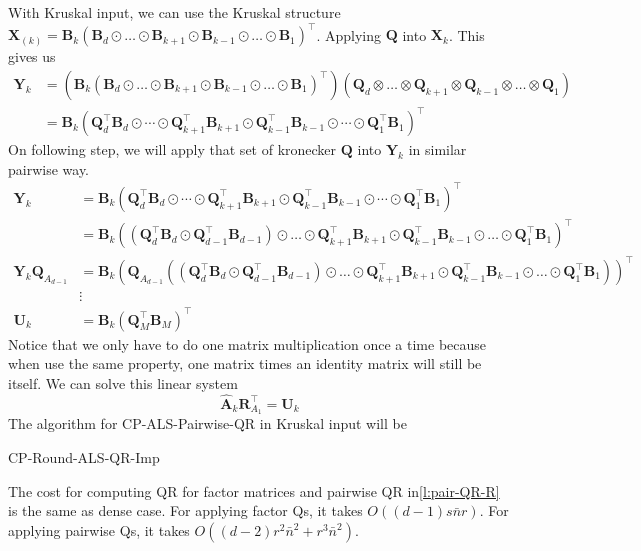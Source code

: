 \documentclass{article}
\newcommand{\mat}[1]{\mathbf{#1}}
\begin{document}
With Kruskal input, we can use the Kruskal structure $\mat{X}_{(k)} = \mat{B}_{k}(\mat{B}_{d} \odot \dots \odot \mat{B}_{k+1} \odot \mat{B}_{k-1}  \odot \dots \odot \mat{B}_{1})^\top$. 
Applying $\mat{Q}$ into $\mat{X}_k$. 
This gives us
\begin{align}
  \mat{Y}_k &= (\mat{B}_{k}(\mat{B}_{d} \odot \dots \odot \mat{B}_{k+1} \odot \mat{B}_{k-1}  \odot \dots \odot \mat{B}_{1})^\top)(\mat{Q}_d \otimes \dots \otimes \mat{Q}_{k+1} \otimes \mat{Q}_{k-1} \otimes \dots \otimes \mat{Q}_1) \nonumber \\
  &= \mat{B}_k(\mat{Q}_d^\top\mat{B}_d \odot \cdots \odot \mat{Q}_{k+1}^\top\mat{B}_{k+1} \odot \mat{Q}_{k-1}^\top\mat{B}_{k-1} \odot \cdots \odot \mat{Q}_1^\top\mat{B}_1)^\top \nonumber
\end{align}
On following step, we will apply that set of kronecker $\mat{Q}$ into $\mat{Y}_k$ in similar pairwise way.
\begin{align}
  \mat{Y}_k &= \mat{B}_k(\mat{Q}_d^\top\mat{B}_d \odot \cdots \odot \mat{Q}_{k+1}^\top\mat{B}_{k+1} \odot \mat{Q}_{k-1}^\top\mat{B}_{k-1} \odot \cdots \odot \mat{Q}_1^\top\mat{B}_1)^\top \nonumber \\
      &= \mat{B}_k((\mat{Q}_d^\top\mat{B}_d \odot \mat{Q}_{d-1}^\top\mat{B}_{d-1}) \odot \dots \odot \mat{Q}_{k+1}^\top\mat{B}_{k+1}\odot \mat{Q}_{k-1}^\top\mat{B}_{k-1} \odot \dots \odot \mat{Q}_{1}^\top\mat{B}_{1})^\top \nonumber      \\
      \mat{Y}_k\mat{Q}_{A_{d-1}}  &= \mat{B}_k(\mat{Q}_{A_{d-1}}((\mat{Q}_d^\top\mat{B}_d \odot \mat{Q}_{d-1}^\top\mat{B}_{d-1}) \odot \dots \odot \mat{Q}_{k+1}^\top\mat{B}_{k+1}\odot \mat{Q}_{k-1}^\top\mat{B}_{k-1} \odot \dots \odot \mat{Q}_{1}^\top\mat{B}_{1}))^\top \nonumber      \\
      & \vdots \nonumber \\
    \mat{U}_k  &= \mat{B}_k(\mat{Q}_M^\top\mat{B}_M)^\top \nonumber  
\end{align}
Notice that we only have to do one matrix multiplication once a time because when use the same property, one matrix times an identity matrix will still be itself.
We can solve this linear system
\begin{equation}
  \mat{\hat{A}}_k\mat{R}_{A_1}^\top = \mat{U}_k 
\end{equation}
The algorithm for CP-ALS-Pairwise-QR in Kruskal input will be
\begin{algorithm}
  \caption{CP-Round-ALS-QR-Imp}
  \label{alg:cp-als-pairwise-qr-kruskal}
  
\end{algorithm}
The cost for computing QR for factor matrices and pairwise QR in\cref{l:pair-QR-R} is the same as dense case.
For applying factor Qs, it takes $O((d-1)s\bar{n}r)$.
For applying pairwise Qs, it takes $O((d-2)r^2\bar{n}^2 + r^3\bar{n}^2)$.
\end{document}
